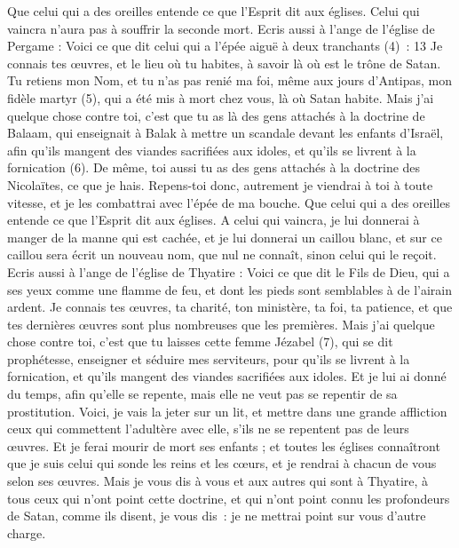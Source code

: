 \begin{multicols}{2}
Que celui qui a des oreilles entende ce que l'Esprit dit aux églises. Celui qui vaincra n’aura pas à souffrir la seconde mort.
Ecris aussi à l'ange de l'église de Pergame : Voici ce que dit celui qui a l'épée aiguë à deux tranchants (4) : 13 Je connais tes œuvres, et le lieu où tu habites, à savoir là où est le trône de Satan. Tu retiens mon Nom, et tu n'as pas renié ma foi, même aux jours d’Antipas, mon fidèle martyr (5), qui a été mis à mort chez vous, là où Satan habite.
Mais j'ai quelque chose contre toi, c'est que tu as là des gens attachés à la doctrine de Balaam, qui enseignait à Balak à mettre un scandale devant les enfants d'Israël, afin qu'ils mangent des viandes sacrifiées aux idoles, et qu'ils se livrent à la fornication (6).
De même, toi aussi tu as des gens attachés à la doctrine des Nicolaïtes, ce que je hais.
Repens-toi donc, autrement je viendrai à toi à toute vitesse, et je les combattrai avec l'épée de ma bouche.
Que celui qui a des oreilles entende ce que l'Esprit dit aux églises. A celui qui vaincra, je lui donnerai à manger de la manne qui est cachée, et je lui donnerai un caillou blanc, et sur ce caillou sera écrit un nouveau nom, que nul ne connaît, sinon celui qui le reçoit.
Ecris aussi à l'ange de l'église de Thyatire : Voici ce que dit le Fils de Dieu, qui a ses yeux comme une flamme de feu, et dont les pieds sont semblables à de l'airain ardent.
Je connais tes œuvres, ta charité, ton ministère, ta foi, ta patience, et que tes dernières œuvres sont plus nombreuses que les premières.
Mais j'ai quelque chose contre toi, c'est que tu laisses cette femme Jézabel (7), qui se dit prophétesse, enseigner et séduire mes serviteurs, pour qu’ils se livrent à la fornication, et qu’ils mangent des viandes sacrifiées aux idoles.
Et je lui ai donné du temps, afin qu'elle se repente, mais elle ne veut pas se repentir de sa prostitution.
Voici, je vais la jeter sur un lit, et mettre dans une grande affliction ceux qui commettent l’adultère avec elle, s'ils ne se repentent pas de leurs œuvres.
Et je ferai mourir de mort ses enfants ; et toutes les églises connaîtront que je suis celui qui sonde les reins et les cœurs, et je rendrai à chacun de vous selon ses œuvres.
Mais je vous dis à vous et aux autres qui sont à Thyatire, à tous ceux qui n'ont point cette doctrine, et qui n'ont point connu les profondeurs de Satan, comme ils disent, je vous dis : je ne mettrai point sur vous d'autre charge.

\end{multicols}
